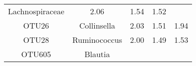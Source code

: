 \documentclass[12pt,]{article}
\begin{document}
\begin{longtable}[]{@{}ccccc@{}}
\begin{minipage}[t]{0.18\columnwidth}
Lachnospiraceae\strut
\end{minipage} & \begin{minipage}[t]{0.17\columnwidth}\centering\strut
2.06\strut
\end{minipage} & \begin{minipage}[t]{0.25\columnwidth}\centering\strut
1.54\strut
\end{minipage} & \begin{minipage}[t]{0.19\columnwidth}\centering\strut
1.52\strut
\end{minipage}\tabularnewline
\begin{minipage}[t]{0.07\columnwidth}\centering\strut
OTU26\strut
\end{minipage} & \begin{minipage}[t]{0.18\columnwidth}\centering\strut
Collinsella\strut
\end{minipage} & \begin{minipage}[t]{0.17\columnwidth}\centering\strut
2.03\strut
\end{minipage} & \begin{minipage}[t]{0.25\columnwidth}\centering\strut
1.51\strut
\end{minipage} & \begin{minipage}[t]{0.19\columnwidth}\centering\strut
1.94\strut
\end{minipage}\tabularnewline
\begin{minipage}[t]{0.07\columnwidth}\centering\strut
OTU28\strut
\end{minipage} & \begin{minipage}[t]{0.18\columnwidth}\centering\strut
Ruminococcus\strut
\end{minipage} & \begin{minipage}[t]{0.17\columnwidth}\centering\strut
2.00\strut
\end{minipage} & \begin{minipage}[t]{0.25\columnwidth}\centering\strut
1.49\strut
\end{minipage} & \begin{minipage}[t]{0.19\columnwidth}\centering\strut
1.53\strut
\end{minipage}\tabularnewline
\begin{minipage}[t]{0.07\columnwidth}\centering\strut
OTU605\strut
\end{minipage} & \begin{minipage}[t]{0.18\columnwidth}\centering\strut
Blautia\strut
\end{minipage} & \begin{minipage}[t]{0.17\columnwidth}\centering\strut

\end{minipage}
\end{longtable}
\end{document}
